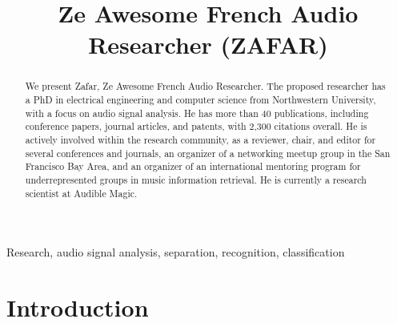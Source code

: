 \documentclass{article}
\title{Ze Awesome French Audio Researcher (ZAFAR)}
\begin{document}
\maketitle

\begin{abstract}
We present Zafar, Ze Awesome French Audio Researcher. The proposed researcher has a PhD in electrical engineering and computer science from Northwestern University, with a focus on audio signal analysis. He has more than 40 publications, including conference papers, journal articles, and patents, with 2,300 citations overall. He is actively involved within the research community, as a reviewer, chair, and editor for several conferences and journals, an organizer of a networking meetup group in the San Francisco Bay Area, and an organizer of an international mentoring program for underrepresented groups in music information retrieval. He is currently a research scientist at Audible Magic.
\end{abstract}

\begin{keywords}
Research, audio signal analysis, separation, recognition, classification
\end{keywords}

\section{Introduction}
\label{sec:intro}

\nocite{patent_rafii_mar2023}
\nocite{patent_cremer_jan2023}
\nocite{patent_cremer_dec2022}
\nocite{patent_rafii_jul2022}
\nocite{patent_berrian_jun2022}
\nocite{patent_liu_jun2022}
\nocite{patent_rafii_jun2022}
\nocite{patent_rafii_mar2022}
\nocite{patent_rafii_oct2021}
\nocite{patent_rafii_may2021}
\nocite{patent_rafii_oct2020}
\nocite{patent_rafii_jul2020}
\nocite{patent_coover_mar2020}
\nocite{patent_pardo_jul2015}

\nocite{article_rafii_nov2024}
\nocite{article_rafii_may2022}
\nocite{article_rafii_nov2018}
\nocite{article_rafii_aug2018}
\nocite{article_rafii_dec2014}
\nocite{article_liutkus_aug2014}
\nocite{article_rafii_jan2013}
\nocite{article_sabin_jun2013}

\nocite{inproceedings_vartakavi_aug2021}
\nocite{inproceedings_kim_sep2018}
\nocite{inproceedings_seetharaman_mar2017}
\nocite{inproceedings_fitzgerald_mar2017}
\nocite{inproceedings_liutkus_feb2017}
\nocite{inproceedings_ono_aug2015}
\nocite{inproceedings_rafii_apr2015}
\nocite{inproceedings_liutkus_apr2015}
\nocite{inproceedings_fitzgerald_jun2014}
\nocite{inproceedings_liutkus_may2014}
\nocite{inproceedings_rafii_may2014}
\nocite{inproceedings_rafii_nov2013}
\nocite{inproceedings_rafii_may2013}
\nocite{inproceedings_rafii_oct2012}
\nocite{inproceedings_liutkus_mar2012}
\nocite{inproceedings_cartwright_aug2011}
\nocite{inproceedings_rafii_may2011}
\nocite{inproceedings_rafii_may2011_2}
\nocite{inproceedings_rafii_oct2009}
\end{document}
